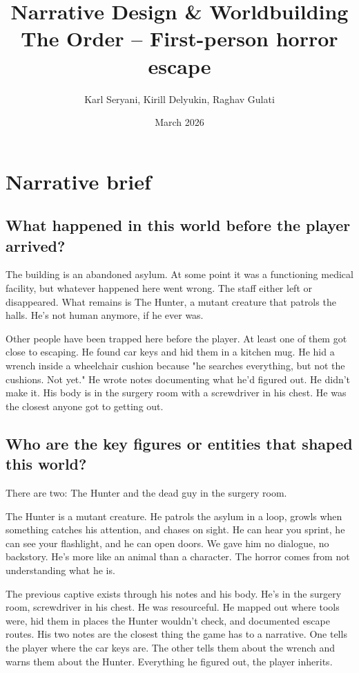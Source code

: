 \documentclass[12pt, a4paper]{article}
\title{\textbf{Narrative Design \& Worldbuilding}\\[0.3em]\large The Order -- First-person horror escape}
\author{Karl Seryani, Kirill Delyukin, Raghav Gulati}
\date{March 2026}
\begin{document}
\maketitle

\section{Narrative brief}

\subsection{What happened in this world before the player arrived?}

The building is an abandoned asylum. At some point it was a functioning medical facility, but whatever happened here went wrong. The staff either left or disappeared. What remains is The Hunter, a mutant creature that patrols the halls. He's not human anymore, if he ever was.

Other people have been trapped here before the player. At least one of them got close to escaping. He found car keys and hid them in a kitchen mug. He hid a wrench inside a wheelchair cushion because "he searches everything, but not the cushions. Not yet." He wrote notes documenting what he'd figured out. He didn't make it. His body is in the surgery room with a screwdriver in his chest. He was the closest anyone got to getting out.

\subsection{Who are the key figures or entities that shaped this world?}

There are two: The Hunter and the dead guy in the surgery room.

The Hunter is a mutant creature. He patrols the asylum in a loop, growls when something catches his attention, and chases on sight. He can hear you sprint, he can see your flashlight, and he can open doors. We gave him no dialogue, no backstory. He's more like an animal than a character. The horror comes from not understanding what he is.

The previous captive exists through his notes and his body. He's in the surgery room, screwdriver in his chest. He was resourceful. He mapped out where tools were, hid them in places the Hunter wouldn't check, and documented escape routes. His two notes are the closest thing the game has to a narrative. One tells the player where the car keys are. The other tells them about the wrench and warns them about the Hunter. Everything he figured out, the player inherits.
\end{document}
